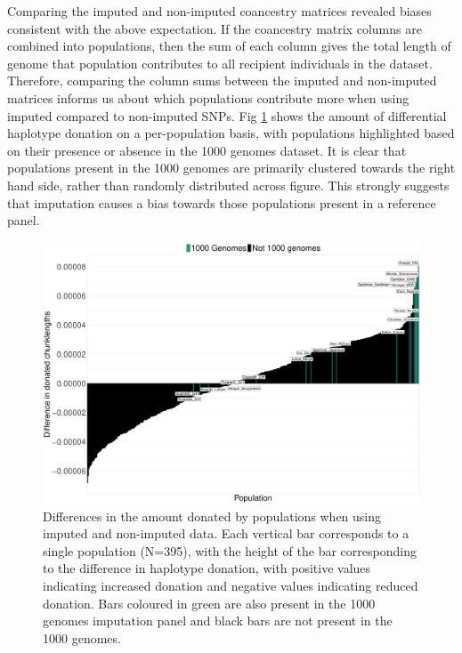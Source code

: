 Comparing the imputed and non-imputed coancestry matrices revealed biases consistent with the above expectation. If the coancestry matrix columns are combined into populations, then the sum of each column gives the total length of genome that population contributes to all recipient individuals in the dataset. Therefore, comparing the column sums between the imputed and non-imputed matrices informs us about which populations contribute more when using imputed compared to non-imputed SNPs. Fig \ref{fig:imputed_excess_copying_pops} shows the amount of differential haplotype donation on a per-population basis, with populations highlighted based on their presence or absence in the 1000 genomes dataset. It is clear that populations present in the 1000 genomes are primarily clustered towards the right hand side, rather than randomly distributed across figure. This strongly suggests that imputation causes a bias towards those populations present in a reference panel. 

\begin{figure}
	    \centering
	    \includegraphics[width=1.0\textwidth]{../images/chapter3/imputed_excess_copying_pops.pdf}
	    \caption{Differences in the amount donated by populations when using imputed and non-imputed data. Each vertical bar corresponds to a single population (N=395), with the height of the bar corresponding to the difference in haplotype donation, with positive values indicating increased donation and negative values indicating reduced donation. Bars coloured in green are also present in the 1000 genomes imputation panel and black bars are not present in the 1000 genomes.}
	    \label{fig:imputed_excess_copying_pops}
\end{figure}


